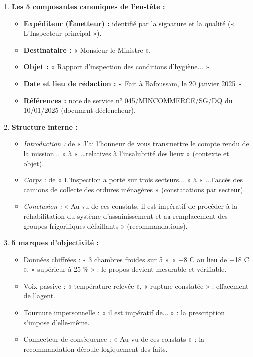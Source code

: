 \documentclass[11pt]{article}
\begin{document}
\begin{corrige}
\begin{enumerate}
\item \textbf{Les 5 composantes canoniques de l'en-tête :}
\begin{itemize}
\item \textbf{Expéditeur (Émetteur) :} identifié par la signature et la qualité (« L'Inspecteur principal »).
\item \textbf{Destinataire :} « Monsieur le Ministre ».
\item \textbf{Objet :} « Rapport d'inspection des conditions d'hygiène... ».
\item \textbf{Date et lieu de rédaction :} « Fait à Bafoussam, le 20 janvier 2025 ».
\item \textbf{Références :} note de service n° 045/MINCOMMERCE/SG/DQ du 10/01/2025 (document déclencheur).
\end{itemize}
\item \textbf{Structure interne :}
\begin{itemize}
\item \emph{Introduction :} de « J'ai l'honneur de vous transmettre le compte rendu de la mission... » à « ...relatives à l'insalubrité des lieux » (contexte et objet).
\item \emph{Corps :} de « L'inspection a porté sur trois secteurs... » à « ...l'accès des camions de collecte des ordures ménagères » (constatations par secteur).
\item \emph{Conclusion :} « Au vu de ces constats, il est impératif de procéder à la réhabilitation du système d'assainissement et au remplacement des groupes frigorifiques défaillants » (recommandations).
\end{itemize}
\item \textbf{5 marques d'objectivité :}
\begin{itemize}
\item Données chiffrées : « 3 chambres froides sur 5 », « +8 \textdegree C au lieu de $-$18 \textdegree C », « supérieur à 25 \% » : le propos devient mesurable et vérifiable.
\item Voix passive : « température relevée », « rupture constatée » : effacement de l'agent.
\item Tournure impersonnelle : « il est impératif de... » : la prescription s'impose d'elle-même.
\item Connecteur de conséquence : « Au vu de ces constats » : la recommandation découle logiquement des faits.

\end{itemize}
\end{enumerate}
\end{corrige}
\end{document}
